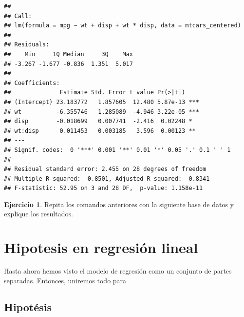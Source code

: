 \documentclass[
  12pt,
]{book}
\newenvironment{Shaded}{\begin{snugshade}}{\end{snugshade}}
\newcommand{\DataTypeTok}[1]{\textcolor[rgb]{0.13,0.29,0.53}{#1}}
\newcommand{\KeywordTok}[1]{\textcolor[rgb]{0.13,0.29,0.53}{\textbf{#1}}}
\newcommand{\NormalTok}[1]{#1}
\newcommand{\OperatorTok}[1]{\textcolor[rgb]{0.81,0.36,0.00}{\textbf{#1}}}
\newcommand{\OtherTok}[1]{\textcolor[rgb]{0.56,0.35,0.01}{#1}}
\newcommand{\StringTok}[1]{\textcolor[rgb]{0.31,0.60,0.02}{#1}}
\theoremstyle{definition}
\theoremstyle{definition}
\theoremstyle{definition}
\newtheorem{exercise}{Ejercicio}[chapter]
\theoremstyle{remark}
\begin{document}
\begin{verbatim}
## 
## Call:
## lm(formula = mpg ~ wt + disp + wt * disp, data = mtcars_centered)
## 
## Residuals:
##    Min     1Q Median     3Q    Max 
## -3.267 -1.677 -0.836  1.351  5.017 
## 
## Coefficients:
##              Estimate Std. Error t value Pr(>|t|)    
## (Intercept) 23.183772   1.857605  12.480 5.87e-13 ***
## wt          -6.355746   1.285089  -4.946 3.22e-05 ***
## disp        -0.018699   0.007741  -2.416  0.02248 *  
## wt:disp      0.011453   0.003185   3.596  0.00123 ** 
## ---
## Signif. codes:  0 '***' 0.001 '**' 0.01 '*' 0.05 '.' 0.1 ' ' 1
## 
## Residual standard error: 2.455 on 28 degrees of freedom
## Multiple R-squared:  0.8501, Adjusted R-squared:  0.8341 
## F-statistic: 52.95 on 3 and 28 DF,  p-value: 1.158e-11
\end{verbatim}

\begin{exercise}

Repita los comandos anteriores con la siguiente base de datos y explique los resultados.

\begin{Shaded}
\end{Shaded}

\end{exercise}

\hypertarget{hipotesis-en-regresiuxf3n-lineal}{%
\section{Hipotesis en regresión lineal}\label{hipotesis-en-regresiuxf3n-lineal}}

Hasta ahora hemos visto el modelo de regresión como un conjunto de partes separadas. Entonces, uniremos todo para

\hypertarget{hipotuxe9sis}{%
\subsection{Hipotésis}\label{hipotuxe9sis}}
\end{document}
